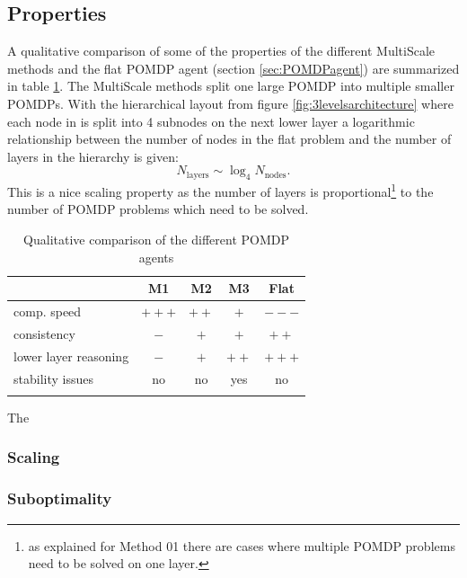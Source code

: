 \subsection{Properties}\label{subsec:MultiScale_properties}
A qualitative comparison of some of the properties of the different MultiScale methods and the flat POMDP agent (section \ref{sec:POMDPagent}) are summarized in table \ref{tab:properties}.  The MultiScale methods split one large POMDP into multiple smaller POMDPs. With the hierarchical layout from figure \ref{fig:3levelsarchitecture} where each node in is split into 4 subnodes on the next lower layer a logarithmic relationship between the number of nodes in the flat problem and the number of layers in the hierarchy is given:
\begin{equation}
    N_\text{layers} \sim \log_4 N_\text{nodes}.
\end{equation}
This is a nice scaling property as the number of layers is proportional\footnote{as explained for Method 01 there are cases where multiple POMDP problems need to be solved on one layer.} to the number of POMDP problems which need to be solved. \\
\begin{table}[h!]
    \centering
    \begin{tabular}{l c c c c}
    \toprule
         &  M1 & M2 & M3 & Flat\\
    \midrule
        \addlinespace
         comp. speed & $+++$ & $++$ & $+$ & $---$ \\
         \addlinespace
         consistency & $-$ & $+$ & $+$ & $++$ \\
         \addlinespace
         lower layer reasoning & $-$ & $+$ & $++$ & $+++$ \\
         \addlinespace
         stability issues & no & no& yes & no\\
         \addlinespace
    \bottomrule
    \end{tabular}
    \caption{Qualitative comparison of the different POMDP agents}
    \label{tab:properties}
\end{table}
The 

\subsubsection{Scaling}
\subsubsection{Suboptimality}


